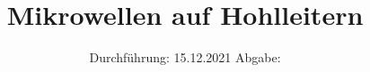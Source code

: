 

\subject{V53}
\title{Mikrowellen auf Hohlleitern}
\date{%
  Durchführung: 15.12.2021
  \hspace{3em}
  Abgabe: 
}



\maketitle
\thispagestyle{empty}
\tableofcontents
\newpage







\printbibliography{}


